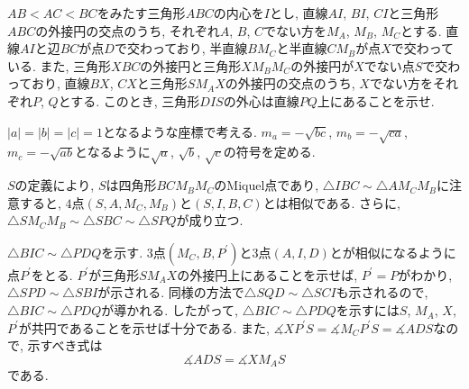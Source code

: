 \begin{bprb}
$AB<AC<BC$をみたす三角形$ABC$の内心を$I$とし, 直線$AI$, $BI$, $CI$と三角形$ABC$の外接円の交点のうち, それぞれ$A$, $B$, $C$でない方を$M_A$, $M_B$, $M_C$とする.
直線$AI$と辺$BC$が点$D$で交わっており, 半直線$BM_C$と半直線$CM_B$が点$X$で交わっている.
また, 三角形$XBC$の外接円と三角形$XM_BM_C$の外接円が$X$でない点$S$で交わっており, 直線$BX$, $CX$と三角形$SM_AX$の外接円の交点のうち, $X$でない方をそれぞれ$P$, $Q$とする.
このとき, 三角形$DIS$の外心は直線$PQ$上にあることを示せ.
\end{bprb}
\begin{ifsol*}
$\lvert a\rvert=\lvert b\rvert=\lvert c\rvert=1$となるような座標で考える.
$m_a=-\sqrt{bc}$, $m_b=-\sqrt{ca}$, $m_c=-\sqrt{ab}$となるように$\sqrt a$, $\sqrt b$, $\sqrt c$の符号を定める.

$S$の定義により, $S$は四角形$BCM_BM_C$のMiquel点であり, $\triangle IBC\sim\triangle AM_CM_B$に注意すると, $4$点$(S,A,M_C,M_B)$と$(S,I,B,C)$とは相似である.
さらに, $\triangle SM_CM_B\sim\triangle SBC\sim\triangle SPQ$が成り立つ.

$\triangle BIC\sim\triangle PDQ$を示す.
$3$点$(M_C,B,P^\prime)$と$3$点$(A,I,D)$とが相似になるように点$P^\prime$をとる.
$P^\prime$が三角形$SM_AX$の外接円上にあることを示せば, $P^\prime=P$がわかり, $\triangle SPD\sim\triangle SBI$が示される.
同様の方法で$\triangle SQD\sim\triangle SCI$も示されるので, $\triangle BIC\sim\triangle PDQ$が導かれる.
したがって, $\triangle BIC\sim\triangle PDQ$を示すには$S$, $M_A$, $X$, $P^\prime$が共円であることを示せば十分である.
また, $\measuredangle XP^\prime S=\measuredangle M_CP^\prime S=\measuredangle ADS$なので, 示すべき式は
\[\measuredangle ADS=\measuredangle XM_AS\]
である.


\end{ifsol*}
